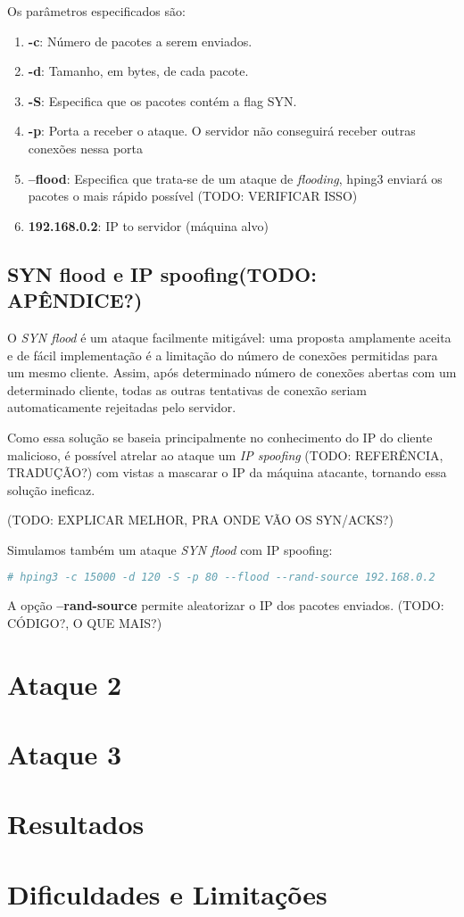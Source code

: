 Os parâmetros especificados são:

\begin{enumerate}
    \item \textbf{-c}: Número de pacotes a serem enviados.
    \item \textbf{-d}: Tamanho, em bytes, de cada pacote.
    \item \textbf{-S}: Especifica que os pacotes contém a flag SYN.
    \item \textbf{-p}: Porta a receber o ataque. O servidor não conseguirá receber outras conexões nessa porta
    \item \textbf{--flood}: Especifica que trata-se de um ataque de \emph{flooding}, hping3 enviará os pacotes o mais rápido possível (TODO: VERIFICAR ISSO)
    \item \textbf{192.168.0.2}: IP to servidor (máquina alvo)
\end{enumerate}




\subsection{SYN flood e IP spoofing(TODO: APÊNDICE?)}

O \emph{SYN flood} é um ataque facilmente mitigável: uma proposta amplamente aceita e de fácil implementação é a limitação do número de conexões permitidas para um mesmo cliente. Assim, após determinado número de conexões abertas com um determinado cliente, todas as outras tentativas de conexão seriam automaticamente rejeitadas pelo servidor.

Como essa solução se baseia principalmente no conhecimento do IP do cliente malicioso, é possível atrelar ao ataque um \emph{IP spoofing} (TODO: REFERÊNCIA, TRADUÇÃO?) com vistas a mascarar o IP da máquina atacante, tornando essa solução ineficaz.

(TODO: EXPLICAR MELHOR, PRA ONDE VÃO OS SYN/ACKS?)

Simulamos também um ataque \emph{SYN flood} com IP spoofing:

\begin{lstlisting}[language=bash]
# hping3 -c 15000 -d 120 -S -p 80 --flood --rand-source 192.168.0.2
\end{lstlisting}

A opção \textbf{--rand-source} permite aleatorizar o IP dos pacotes enviados.
(TODO: CÓDIGO?, O QUE MAIS?)


\section{Ataque 2}


\section{Ataque 3}


\section{Resultados}



\section{Dificuldades e Limitações}

